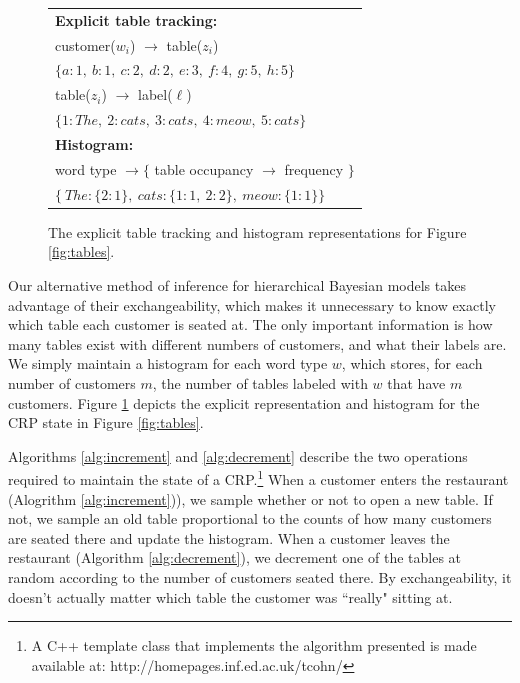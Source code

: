 \documentclass[11pt]{article}
\begin{document}
\begin{figure}
\begin{tabular}{l}
{\bf Explicit table tracking:} \\
customer($w_i$) $\rightarrow$ table($z_i$) \\
{\small $\Big \{a:1,\ b:1,\ c:2,\ d:2,\ e:3,\ f:4,\ g:5,\ h:5 \Big \}$} \\
table($z_i$) $\rightarrow$ label($\ell$) \\
{\small $\Big \{1: The,\ 2: cats,\ 3: cats,\ 4: meow,\ 5: cats \Big \} $}
\vspace{0.05cm} \\
\bf{Histogram:} \\
word type $\rightarrow \Big \{$ table occupancy $\rightarrow$ frequency $\Big \}$ \\
{\small $\Big \{\ The : \{2:1\},\ cats : \{1:1,\ 2:2\},\ meow : \{1:1\} \Big \}$} \\
\end{tabular}

\caption[]{The explicit table tracking and histogram representations for Figure \ref{fig:tables}.}
\label{fig:histogram}
\end{figure}

Our alternative method of inference for hierarchical Bayesian models takes advantage of their exchangeability, which makes it unnecessary to know exactly which table each customer is seated at.  The only important information is how many tables exist with different numbers of customers, and what their labels are.  We simply maintain a histogram for each word type $w$, which stores, for each number of customers $m$, the number of tables labeled with $w$ that have $m$ customers.
Figure \ref{fig:histogram} depicts the explicit representation and histogram for the CRP state in Figure \ref{fig:tables}.

Algorithms \ref{alg:increment} and \ref{alg:decrement} describe the two operations required to maintain the state of a CRP.\footnote{A C++ template class that implements the algorithm presented is made available at: {http://homepages.inf.ed.ac.uk/tcohn/}}
When a customer enters the restaurant (Alogrithm \ref{alg:increment})), we sample whether or not to open a new table.  If not, we sample an old table proportional to the counts of how many customers are seated there and update the histogram.  When a customer leaves the restaurant (Algorithm \ref{alg:decrement}), we decrement one of the tables at random according to the number of customers seated there.  By exchangeability, it doesn't actually matter which table the customer was ``really" sitting at.
\end{document}
